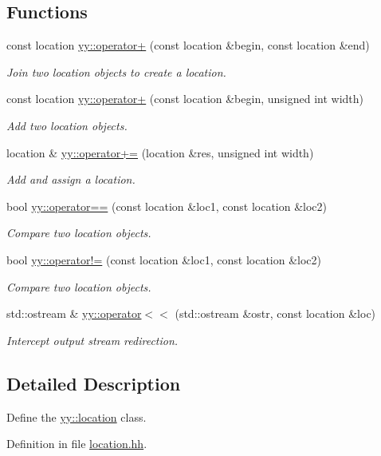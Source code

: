 \subsection*{Functions}
\begin{DoxyCompactItemize}
\item 
const location \hyperlink{namespaceyy_a2d68df6e5746b9aca23e7445c7a558a8}{yy::operator+} (const location \&begin, const location \&end)
\begin{DoxyCompactList}\small\item\em Join two location objects to create a location. \end{DoxyCompactList}\item 
const location \hyperlink{namespaceyy_a09401c271b0db8cdd3b70df37b5ac660}{yy::operator+} (const location \&begin, unsigned int width)
\begin{DoxyCompactList}\small\item\em Add two location objects. \end{DoxyCompactList}\item 
location \& \hyperlink{namespaceyy_a9c677252f514775b4ac6522044b1971b}{yy::operator+=} (location \&res, unsigned int width)
\begin{DoxyCompactList}\small\item\em Add and assign a location. \end{DoxyCompactList}\item 
bool \hyperlink{namespaceyy_a466b6e3dcf6a743bb058bf4989b38047}{yy::operator==} (const location \&loc1, const location \&loc2)
\begin{DoxyCompactList}\small\item\em Compare two location objects. \end{DoxyCompactList}\item 
bool \hyperlink{namespaceyy_aa3a5c205bc084696bb894634ae9cce80}{yy::operator!=} (const location \&loc1, const location \&loc2)
\begin{DoxyCompactList}\small\item\em Compare two location objects. \end{DoxyCompactList}\item 
std::ostream \& \hyperlink{namespaceyy_a0cf2eadbbdd9836330989250647ee264}{yy::operator$<$$<$} (std::ostream \&ostr, const location \&loc)
\begin{DoxyCompactList}\small\item\em Intercept output stream redirection. \end{DoxyCompactList}\end{DoxyCompactItemize}


\subsection{Detailed Description}
Define the \hyperlink{classyy_1_1location}{yy::location} class. 

Definition in file \hyperlink{location_8hh_source}{location.hh}.

